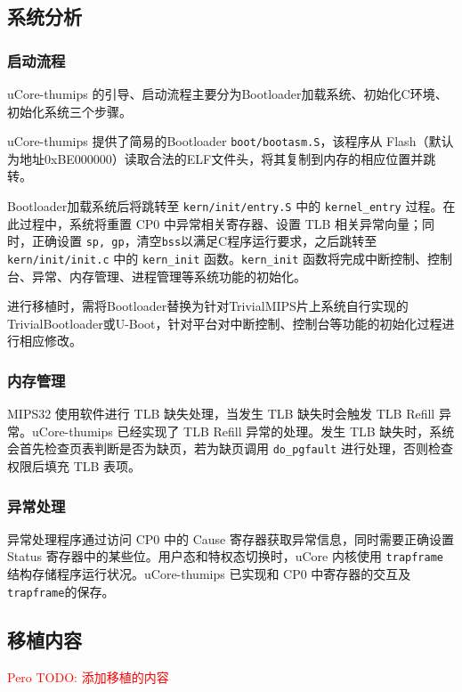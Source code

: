 \subsection{系统分析}

\subsubsection{启动流程}
uCore-thumips 的引导、启动流程主要分为Bootloader加载系统、初始化C环境、初始化系统三个步骤。

uCore-thumips 提供了简易的Bootloader \texttt{boot/bootasm.S}，该程序从 Flash（默认为地址0xBE000000）读取合法的ELF文件头，将其复制到内存的相应位置并跳转。

Bootloader加载系统后将跳转至 \texttt{kern/init/entry.S} 中的 \texttt{kernel\_entry} 过程。在此过程中，系统将重置 CP0 中异常相关寄存器、设置 TLB 相关异常向量；同时，正确设置 \texttt{sp, gp}，清空\texttt{bss}以满足C程序运行要求，之后跳转至 \texttt{kern/init/init.c} 中的 \texttt{kern\_init} 函数。\texttt{kern\_init} 函数将完成中断控制、控制台、异常、内存管理、进程管理等系统功能的初始化。

进行移植时，需将Bootloader替换为针对TrivialMIPS片上系统自行实现的TrivialBootloader或U-Boot，针对平台对中断控制、控制台等功能的初始化过程进行相应修改。

\subsubsection{内存管理}

MIPS32 使用软件进行 TLB 缺失处理，当发生 TLB 缺失时会触发 TLB Refill 异常。uCore-thumips 已经实现了 TLB Refill 异常的处理。发生 TLB 缺失时，系统会首先检查页表判断是否为缺页，若为缺页调用 \texttt{do\_pgfault} 进行处理，否则检查权限后填充 TLB 表项。

\subsubsection{异常处理}
异常处理程序通过访问 CP0 中的 Cause 寄存器获取异常信息，同时需要正确设置 Status 寄存器中的某些位。用户态和特权态切换时，uCore 内核使用 \texttt{trapframe} 结构存储程序运行状况。uCore-thumips 已实现和 CP0 中寄存器的交互及\texttt{trapframe}的保存。

\subsection{移植内容}

\textcolor{red}{Pero TODO: 添加移植的内容}

